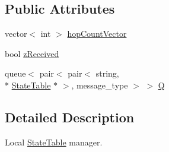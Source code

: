 \subsection*{Public Attributes}
\begin{DoxyCompactItemize}
\item 
vector$<$ int $>$ \hyperlink{classStateTableManager_a3846ef7fd2abcbf042e0a908e45c3fd4}{hop\-Count\-Vector}
\item 
bool \hyperlink{classStateTableManager_a9895a129ebb8725c0ecfb3907f1ae23a}{z\-Received}
\item 
queue$<$ pair$<$ pair$<$ string, \\*
\hyperlink{structStateTable}{State\-Table} $\ast$ $>$, message\-\_\-type $>$ $>$ \hyperlink{classStateTableManager_a6f7b7e7d9b63c79252aff1de8a13e3b7}{Q}
\end{DoxyCompactItemize}


\subsection{Detailed Description}
Local \hyperlink{structStateTable}{State\-Table} manager. 

